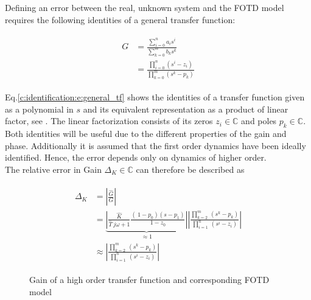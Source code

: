Defining an error between the real, unknown system and the FOTD model requires the following identities of a general transfer function:

\begin{align}
\begin{split}
G &=  \frac{\sum_{i=0}^n a_i s^i}{\sum_{k=0}^m b_k s^k} \\
&= \frac{\prod_{i=0}^n \left( s^i - z_i \right)}{\prod_{k=0}^m \left( s^k-p_k\right)} 
\end{split}
\label{c:identification:e:general_tf}
\end{align}

Eq.\ref{c:identification:e:general_tf} shows the identities of a transfer function given as a polynomial in $s$ and its equivalent representation as a product of linear factor, see \cite[p.269 ff.]{Lunze2016}. The linear factorization consists of its zeros $z_i \in \mathbb{C}$ and poles $p_k \in \mathbb{C}$. Both identities will be useful due to the different properties of the gain and phase. Additionally it is assumed that the first order dynamics have been ideally identified. Hence, the error depends only on dynamics of higher order.\\

The relative error in Gain $\Delta_K \in \mathbb{C}$ can therefore be described as

\begin{align}
\begin{split}
\Delta_K &= \left| \frac{\hat{G}}{G}\right| \\
&= \underbrace{\left|\frac{\hat{K}}{\hat{T}~j\omega+1} \frac{\left(\ 1-p_0 \right)\left( s- p_1 \right)}{1-z_0} \right|}_{\approx 1} \left| \frac{\prod_{k=2}^m~(s^k-p_k)}{\prod_{i=1}^n~(s^i-z_i)} \right| \\
&\approx \left| \frac{\prod_{k=2}^m~(s^k-p_k)}{\prod_{i=1}^n~(s^i-z_i)} \right|
\end{split}
\label{c:identification:e:error_gain}
\end{align}

\begin{figure}[H]\centering
  
  \caption{Gain of a high order transfer function and corresponding FOTD model}
  \label{c:identification:f:gain_fotd}
\end{figure}

